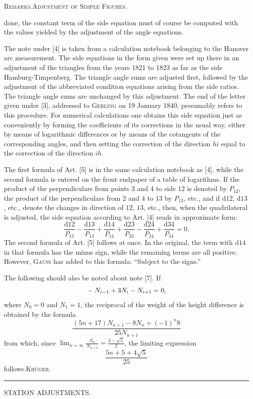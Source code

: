 \clearpage
{}\hfill\textsc{Remarks.\quad Adjustment of Simple Figures.}\hfill\mbox{}\par\medskip
\begingroup\footnotesize
\noindent done, the constant term of the side equation must of course be computed with the values yielded by the adjustment of the angle equations.

The note under [4] is taken from a calculation notebook belonging to the Hanover arc measurement. The side equations in the form given were set up there in an adjustment of the triangles from the years 1821 to 1823 as far as the side Hamburg-Timpenberg. The triangle angle sums are adjusted first, followed by the adjustment of the abbreviated condition equations arising from the side ratios. The triangle angle sums are unchanged by this adjustment. The end of the letter given under [3], addressed to \textsc{Gerling} on 19 January 1840, presumably refers to this procedure. For numerical calculations one obtains this side equation just as conveniently by forming the coefficients of its corrections in the usual way, either by means of logarithmic differences or by means of the cotangents of the corresponding angles, and then setting the correction of the direction $hi$ equal to the correction of the direction $ih$.

The first formula of Art. [5] is in the same calculation notebook as [4], while the second formula is entered on the front endpaper of a table of logarithms. If the product of the perpendiculars from points $3$ and $4$ to side $12$ is denoted by $P_{12}$, the product of the perpendiculars from $2$ and $4$ to $13$ by $P_{13}$, etc., and if $\mathrm d12$, $\mathrm d13$, etc., denote the changes in direction of $12$, $13$, etc., then, when the quadrilateral is adjusted, the side equation according to Art. [4] reads in approximate form:
\[
\frac{\mathrm d12}{P_{12}}-\frac{\mathrm d13}{P_{13}}+\frac{\mathrm d14}{P_{14}}+\frac{\mathrm d23}{P_{23}}-\frac{\mathrm d24}{P_{24}}+\frac{\mathrm d34}{P_{34}}=0.
\]
The second formula of Art. [5] follows at once. In the original, the term with $\mathrm d14$ in that formula has the minus sign, while the remaining terms are all positive. However, \textsc{Gauss} has added to this formula: “Subject to the signs.”

The following should also be noted about note [7]. If
\[
\llap{\raisebox{1ex}{\text{\tiny.}}\hspace{4cm}}-N_{i-1}+3N_i-N_{i+1}=0,
\]
\noindent where $N_0=0$ and $N_1=1$, the reciprocal of the weight of the height difference is obtained by the formula
\[
\frac{(5n+17)N_{n+1}-8N_n+(-1)^n8}{25N_{n+1}}
\]
\noindent from which, since $\displaystyle\lim_{n=\infty}\frac{N_n}{N_{n+1}}=\frac{3-\sqrt5}{2}$, the limiting expression
\[
\frac{5n+5+4\sqrt5}{25}
\]
\noindent follows.\hfill\textsc{Krüger.}\par
\endgroup
\vspace{1.6cm}
\begin{center}\rule{4cm}{.4pt}\end{center}

\clearpage
\null{}
\begin{center}{\LARGE STATION ADJUSTMENTS.}\end{center}
\endgroup
